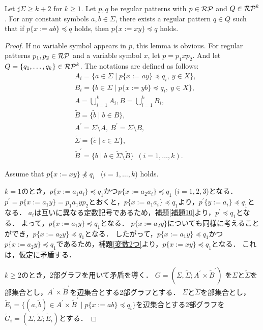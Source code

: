 \begin{lem}\label{追加補題1}
Let $\sharp \Sigma \ge k+2$ for $k\geq 1$. Let $p,q$ be regular patterns with $p \in \mathcal{RP}$ and $Q \in \mathcal{RP}^{k}$.
For any constant symbols $a, b \in \Sigma$, there exists a regular pattern $q \in Q$ such that if $p \{ x:=ab \} \preceq q$ holds, then $p \{ x:=xy \} \preceq q$ holds.
\end{lem}
\begin{proof}
If no variable symbol appears in $p$, this lemma is obvious.
For regular patterns $p_{1},p_{2}\in \mathcal{RP}$ and a variable symbol $x$, let $p=p_{1}xp_{2}$.
And let $Q=\{ q_{1}, \ldots , q_{k} \}\in \mathcal{RP}^{k}$.
The notations are defined as follows:
\begin{align*}
& A_{i} = \{ a \in \Sigma \mid p \{ x:=ay \} \preceq q_{i},\ y\in X\},\\ 
& B_{i} = \{ b \in \Sigma \mid p \{ x:=yb \} \preceq q_{i},\ y\in X\},\\ 
& A = \bigcup_{i=1}^{k}A_{i},B = \bigcup_{i=1}^{k} B_{i},\\
& \tilde{B} = \{ \tilde{b} \mid b \in B \},\\
& A^{\prime} = \Sigma\setminus A,~B^{\prime} = \Sigma\setminus B,\\
& \tilde{\Sigma} = \{ \tilde{c} \mid c \in \Sigma \},\\
& \tilde{B}^{\prime} = \{ b \mid b \in \tilde{\Sigma} \setminus \tilde{B} \}~~(i=1, \ldots , k).
\end{align*}

Assume that $p \{ x:=xy \} \not \preceq q_{i}$ \ ($i=1, \ldots , k$) holds.

$k=1$のとき，$p \{ x:=a_{1}a_{i} \} \preceq q_{1}$かつ$p \{ x:=a_{2}a_{i} \} \preceq q_{1}$ ($i=1,2,3$)となる．
$p^{\prime} = p \{ x:=a_{1}y \} = p_{1}a_{1}yp_{2}$とおくと，$p \{ x:=a_{1}a_{i} \} \preceq q_{1}$より，$p^{\prime} \{ y:=a_{i} \} \preceq q_{1}$となる．
$a_{i}$は互いに異なる定数記号であるため，補題\ref{補題10}より，$p^{\prime} \preceq q_{1}$となる．
よって，$p \{ x:=a_{1}y \} \preceq q_{1}$となる．
$p \{ x:=a_{2}y \}$についても同様に考えることができ，$p \{ x:=a_{2}y \} \preceq q_{1}$となる．
したがって，$p \{ x:=a_{1}y \} \preceq q_{1}$かつ$p \{ x:=a_{2}y \} \preceq q_{1}$であるため，補題\ref{変数2つ}より，$p \{ x:= xy \} \preceq q_{1}$となる．
これは，仮定に矛盾する．

$k \ge 2$のとき，2部グラフを用いて矛盾を導く．
$G=(\Sigma,\tilde{\Sigma}; A^{\prime} \times \tilde{B}^{\prime})$
を$\Sigma$と$\tilde{\Sigma}$を部集合とし，$A^{\prime} \times \tilde{B}^{\prime}$を辺集合とする2部グラフとする．
$\Sigma$と$\tilde{\Sigma}$を部集合とし，$\tilde{E}_{i}=\{ (a, \tilde{b}) \in A^{\prime} \times \tilde{B}^{\prime} \mid p \{ x:=ab \} \preceq q_{i} \}$を辺集合とする2部グラフを$\tilde{G}_{i}=(\Sigma,\tilde{\Sigma}; \tilde{E}_{i})$とする．


\end{proof}

